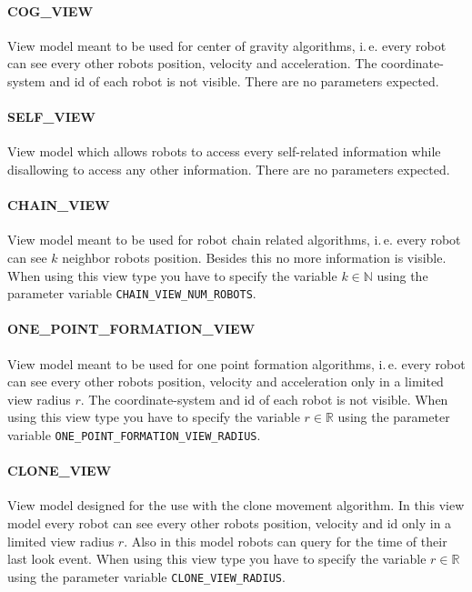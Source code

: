 \paragraph{COG\_VIEW} View model meant to be used for center of gravity algorithms, i.\,e. every robot can see every other robots position, velocity and acceleration. The coordinate-system and id of each robot is not visible. There are no parameters expected.

\paragraph{SELF\_VIEW} View model which allows robots to access every self-related information while disallowing to access any other information. There are no parameters expected.

\paragraph{CHAIN\_VIEW} View model meant to be used for robot chain related algorithms, i.\,e. every robot can see $k$ neighbor robots position. Besides this no more information is visible. When using this view type you have to specify the variable $k \in \mathbb{N}$ using the parameter variable \texttt{CHAIN\_VIEW\_NUM\_ROBOTS}.

\paragraph{ONE\_POINT\_FORMATION\_VIEW} View model meant to be used for one point formation algorithms, i.\,e. every robot can see every other robots position, velocity and acceleration only in a limited view radius $r$. The coordinate-system and id of each robot is not visible. When using this view type you have to specify the variable $r \in \mathbb{R}$ using the parameter variable \texttt{ONE\_POINT\_FORMATION\_VIEW\_RADIUS}.

\paragraph{CLONE\_VIEW} View model designed for the use with the clone movement algorithm. In this view model every robot can see every other robots position, velocity and id only in a limited view radius $r$. Also in this model robots can query for the time of their last look event. When using this view type you have to specify the variable $r \in \mathbb{R}$ using the parameter variable \texttt{CLONE\_VIEW\_RADIUS}.



